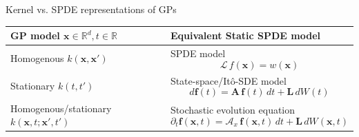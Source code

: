 \documentclass[first=dgreen,second=purple,presentation]{elecslides}
\begin{document}
\begin{frame}{Kernel vs. SPDE representations of GPs}

\begin{tabularx}{0.98\textwidth}{ | p{} | p{} | }
\hline
\cellcolor{blue!25}GP model $\mathbf{x} \in \mathbb{R}^d, t \in \mathbb{R}$ & \cellcolor{blue!25}Equivalent Static SPDE model \\
\hline
\hline
Homogenous $k(\mathbf{x},\mathbf{x}')$ &
SPDE model
\begin{equation}
  \mathcal{L} \, f(\mathbf{x}) = w(\mathbf{x})
\nonumber
\end{equation}
\\
\hline
Stationary $k(t,t')$ &
State-space/It\^o-SDE model 
\begin{equation}
d\mathbf{f}(t) = \mathbf{A} \, \mathbf{f}(t) \, dt + \mathbf{L} \, dW(t)
\nonumber
\end{equation}
\\
\hline
Homogenous/stationary $k(\mathbf{x},t;\mathbf{x}',t')$ & 
Stochastic evolution equation
\begin{equation}
\partial_t \mathbf{f}(\mathbf{x},t)
= \mathcal{A}_x \, \mathbf{f}(\mathbf{x},t) \, dt + \mathbf{L} \, dW(\mathbf{x},t)
\nonumber
\end{equation}
\\
\hline
\end{tabularx}

\end{frame}
\end{document}
